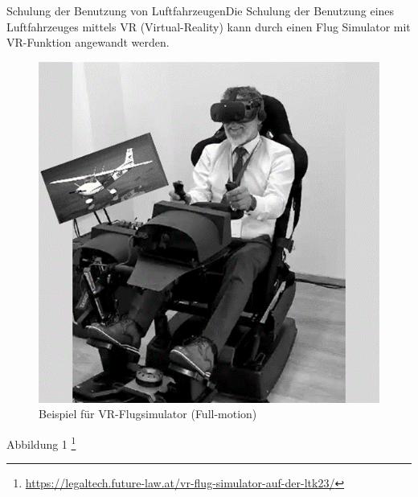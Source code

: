Schulung der Benutzung von LuftfahrzeugenDie Schulung der Benutzung eines Luftfahrzeuges mittels VR (Virtual-Reality) kann durch einen Flug Simulator mit VR-Funktion angewandt werden.
\\
\begin{figure}[!ht]
    \centering
    \includegraphics[width=1.0\textwidth]{images/Abbildung 1.png}
    \caption{\label{fig:Abbildung 1}Beispiel für VR-Flugsimulator (Full-motion)\protect
    }
\end{figure}
Abbildung 1 \footnote{\url{https://legaltech.future-law.at/vr-flug-simulator-auf-der-ltk23/}}
\\
